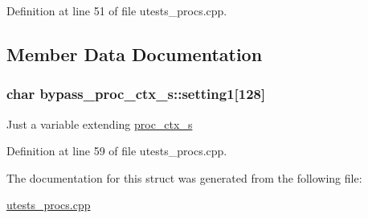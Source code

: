 Definition at line 51 of file utests\+\_\+procs.\+cpp.



\subsection{Member Data Documentation}
\subsubsection[{\texorpdfstring{setting1}{setting1}}]{\setlength{\rightskip}{0pt plus 5cm}char bypass\+\_\+proc\+\_\+ctx\+\_\+s\+::setting1\mbox{[}128\mbox{]}}\hypertarget{structbypass__proc__ctx__s_aad5fb610a17e7125f87c7cea253cff60}{}\label{structbypass__proc__ctx__s_aad5fb610a17e7125f87c7cea253cff60}
Just a variable extending \hyperlink{structproc__ctx__s}{proc\+\_\+ctx\+\_\+s} 

Definition at line 59 of file utests\+\_\+procs.\+cpp.



The documentation for this struct was generated from the following file\+:\begin{DoxyCompactItemize}
\item 
\hyperlink{utests__procs_8cpp}{utests\+\_\+procs.\+cpp}\end{DoxyCompactItemize}
